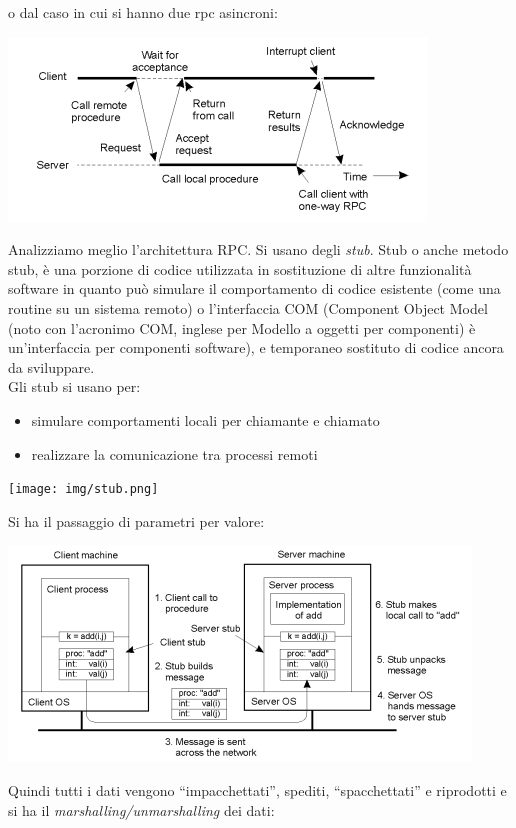 \documentclass[a4paper,12pt, oneside]{book}
\begin{document}
o dal caso in cui si hanno due rpc asincroni:
\begin{center}
\includegraphics[scale=0.7]{img/rpc3.png}
\end{center}
Analizziamo meglio l'architettura RPC. Si usano degli \textit{stub}. Stub o anche metodo stub, è una porzione di codice utilizzata in sostituzione di
altre funzionalità software in quanto può simulare il comportamento di codice
esistente (come una routine su un sistema remoto) o l'interfaccia COM
(Component Object Model (noto con l'acronimo COM, inglese per Modello a oggetti
per componenti) è un'interfaccia per componenti software),
e temporaneo sostituto di codice ancora da sviluppare.\\
Gli stub si usano per:
\begin{itemize}
\item simulare comportamenti locali per chiamante e chiamato
\item realizzare la comunicazione tra processi remoti
\end{itemize}
\begin{center}
\texttt{[image: img/stub.png]}
\end{center}
Si ha il passaggio di parametri per valore:
\begin{center}
\includegraphics[scale=0.7]{img/stub2.png}
\end{center}
Quindi tutti i dati vengono ``impacchettati'', spediti,
``spacchettati'' e riprodotti e si ha il \textit{marshalling/unmarshalling} dei dati:
\end{document}
